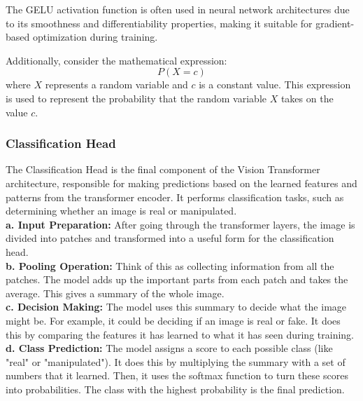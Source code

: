 The GELU activation function is often used in neural network architectures due to its smoothness and differentiability properties, making it suitable for gradient-based optimization during training.

\noindent Additionally, consider the mathematical expression:
\[
    P(X = c)
\]
where $X$ represents a random variable and $c$ is a constant value. This expression is used to represent the probability that the random variable $X$ takes on the value $c$.




\subsubsection{Classification Head}
The Classification Head is the final component of the Vision Transformer architecture, responsible for making predictions based on the learned features and patterns from the transformer encoder. It performs classification tasks, such as determining whether an image is real or manipulated.
\\

\noindent \textbf{a. Input Preparation:} After going through the transformer layers, the image is divided into patches and transformed into a useful form for the classification head.
\\

\noindent \textbf{b. Pooling Operation:} Think of this as collecting information from all the patches. The model adds up the important parts from each patch and takes the average. This gives a summary of the whole image.
\\

\noindent \textbf{c. Decision Making:} The model uses this summary to decide what the image might be. For example, it could be deciding if an image is real or fake. It does this by comparing the features it has learned to what it has seen during training.
\\

\noindent \textbf{d. Class Prediction:} The model assigns a score to each possible class (like "real" or "manipulated"). It does this by multiplying the summary with a set of numbers that it learned. Then, it uses the softmax function to turn these scores into probabilities. The class with the highest probability is the final prediction.


\newpage
